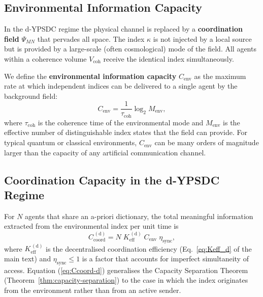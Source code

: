 \documentclass[12pt,a4paper]{article}
\theoremstyle{remark}
\begin{document}
	\subsection{Environmental Information Capacity}
	\label{subsec:env-capacity}
	
	In the d-YPSDC regime the physical channel is replaced by a \textbf{coordination
		field} $\Psi_{MN}$ that pervades all space. The index $\kappa$ is not injected
	by a local source but is provided by a large-scale (often cosmological) mode of
	the field. All agents within a coherence volume $V_{\mathrm{coh}}$ receive the
	identical index simultaneously.
	
	We define the \textbf{environmental information capacity} $C_{\mathrm{env}}$ as the
	maximum rate at which independent indices can be delivered to a single agent by the
	background field:
	\begin{equation}
		C_{\mathrm{env}} = \frac{1}{\tau_{\mathrm{coh}}} \log_2 M_{\mathrm{env}},
		\label{eq:Cenv}
	\end{equation}
	where $\tau_{\mathrm{coh}}$ is the coherence time of the environmental mode and
	$M_{\mathrm{env}}$ is the effective number of distinguishable index states that
	the field can provide. For typical quantum or classical environments,
	$C_{\mathrm{env}}$ can be many orders of magnitude larger than the capacity of
	any artificial communication channel.
	
	\subsection{Coordination Capacity in the d-YPSDC Regime}
	\label{subsec:coord-capacity-dypsdc}
	
	For $N$ agents that share an a-priori dictionary, the total meaningful information
	extracted from the environmental index per unit time is
	\begin{equation}
		C_{\mathrm{coord}}^{\,(\mathrm{d})} = N \; K_{\mathrm{eff}}^{\,(\mathrm{d})} \;
		C_{\mathrm{env}} \; \eta_{\mathrm{sync}},
		\label{eq:Ccoord-d}
	\end{equation}
	where $K_{\mathrm{eff}}^{\,(\mathrm{d})}$ is the decentralised coordination efficiency
	(Eq.\ \eqref{eq:Keff_d} of the main text) and $\eta_{\mathrm{sync}} \le 1$ is a
	factor that accounts for imperfect simultaneity of access. Equation
	(\ref{eq:Ccoord-d}) generalises the Capacity Separation Theorem
	(Theorem~\ref{thm:capacity-separation}) to the case in which the index originates
	from the environment rather than from an active sender.
	
\end{document}
